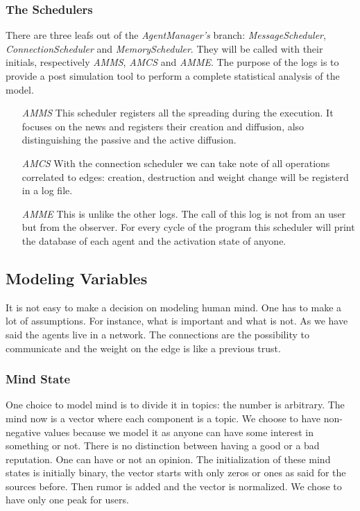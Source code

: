 \subsubsection{The Schedulers}
There are three leafs out of the \textit{AgentManager's} branch:
\textit{MessageScheduler}, \textit{ConnectionScheduler} and
\textit{MemoryScheduler}. They will be called with their initials,
respectively \textit{AMMS}, \textit{AMCS} and \textit{AMME}.
The purpose of the logs is to provide a post simulation tool to perform
a complete statistical analysis of the model. 
\begin{itemize}
\item [\textit{AMMS}] This scheduler registers all the spreading during the
  execution. It focuses on the news and registers their creation and
  diffusion, also distinguishing the passive and the active diffusion.
\item [\textit{AMCS}] With the connection scheduler we can take note of
  all operations correlated to edges: creation, destruction and weight
  change will be registerd in a log file.
\item [\textit{AMME}] This is unlike the other logs. The call of this log is
  not from an user but from the observer. For every cycle of the program
  this scheduler will print the database of each agent and the activation
  state of anyone.
\end{itemize}

\subsection{Modeling Variables}
It is not easy to make a decision on modeling human mind. One has to make
a lot of assumptions. For instance, what is important and what is not.
As we have said the agents live in a network. The connections are the
possibility to communicate and the weight on the edge is like a previous
trust.

\subsubsection{Mind State}
One choice to model mind is to divide it in topics: the number is arbitrary.
The mind now is a vector where each component is a topic. We choose to have
non-negative values because we model it as anyone can have some interest in
something or not. There is no distinction between having a good or a bad
reputation. One can have or not an opinion.
The initialization of these mind states is initially binary, the vector starts
with only zeros or ones as said for the sources before. Then rumor is added
and the vector is normalized. We chose to have only one peak for users.

